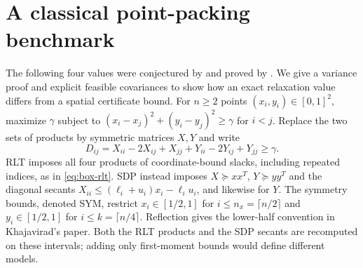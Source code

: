 \section{A classical point-packing benchmark}\label{app:point-packing}
The following four values were conjectured by \citet[Section 4]{Anstreicher2009}
and proved by \citet[Propositions 1(i--ii) and 3]{Khajavirad2024}.
We give a variance proof and explicit feasible covariances to show how
an exact relaxation value differs from a spatial certificate bound.
For $n\ge2$ points $(x_i,y_i)\in[0,1]^2$, maximize $\gamma$ subject to
$(x_i-x_j)^2+(y_i-y_j)^2\ge\gamma$ for $i<j$. Replace the two sets of
products by symmetric matrices $X,Y$ and write
\[
 D_{ij}=X_{ii}-2X_{ij}+X_{jj}+Y_{ii}-2Y_{ij}+Y_{jj}\ge\gamma.
\]
RLT imposes all four products of coordinate-bound slacks, including
repeated indices, as in \eqref{eq:box-rlt}. SDP instead imposes
$X\succeq xx^T$, $Y\succeq yy^T$ and the diagonal secants
$X_{ii}\le(\ell_i+u_i)x_i-\ell_i u_i$, and likewise for $Y$.
The symmetry bounds, denoted SYM, restrict $x_i\in[1/2,1]$ for
$i\le n_x=\lceil n/2\rceil$ and $y_i\in[1/2,1]$ for
$i\le k=\lceil n/4\rceil$. Reflection gives the lower-half convention
in Khajavirad's paper. Both the RLT products and the SDP secants are
recomputed on these intervals; adding only first-moment bounds would
define different models.

